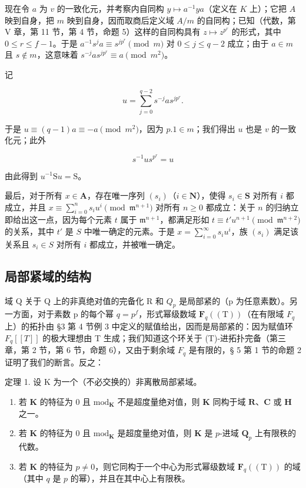 现在令 \(a\) 为 \(v\) 的一致化元，并考察内自同构 \(y \mapsto a^{-1}ya\)（定义在 \(K\) 上）；它把 \(A\) 映到自身，把 \(m\) 映到自身，因而取商后定义域 \(A/m\) 的自同构；已知（代数，第 V 章，第 11 节，第 4 节，命题 5）这样的自同构具有 \(z \mapsto z^{p^r}\) 的形式，其中 \(0 \leqslant r \leqslant f - 1\)。于是 \(a^{-1}s^j a \equiv s^{jp^r} \pmod{m}\) 对 \(0 \leqslant j \leqslant q - 2\) 成立；由于 \(a \in m\) 且 \(s \notin m\)，这意味着 \(s^{-j}as^{jp^r} \equiv a \pmod{m^2}\)。

记

\[
u = \sum_ {j = 0} ^ {q - 2} s ^ {- j} a s ^ {j p ^ {r}}.
\]

于是 \(u \equiv (q - 1)a \equiv -a \pmod{m^2}\)，因为 \(p.1 \in m\)；我们得出 \(u\) 也是 \(v\) 的一致化元；此外

\[
s ^ {- 1} u s ^ {p ^ {r}} = u\tag{3}
\]

由此得到 \(u^{-1} \mathrm{S}u = \mathrm{S}\)。

最后，对于所有 \(x \in \mathbf{A}\)，存在唯一序列 \((s_i)\)（\(i \in \mathbf{N}\)），使得 \(s_i \in \mathbf{S}\) 对所有 \(i\) 都成立，并且 \(x \equiv \sum_{i=0}^{n} s_i u^i \pmod{\mathfrak{m}^{n+1}}\) 对所有 \(n \geqslant 0\) 都成立：关于 \(n\) 的归纳立即给出这一点，因为每个元素 \(t\) 属于 \(\mathfrak{m}^{n+1}\)，都满足形如 \(t \equiv t'u^{n+1} \pmod{\mathfrak{m}^{n+2}}\) 的关系，其中 \(t'\) 是 \(S\) 中唯一确定的元素。于是 \(x = \sum_{i=0}^{\infty} s_i u^i\)，族 \((s_i)\) 满足该关系且 \(s_i \in S\) 对所有 \(i\) 都成立，并被唯一确定。

\subsection{局部紧域的结构}

域 Q 关于 Q 上的非真绝对值的完备化 R 和 \(Q_{p}\) 是局部紧的（p 为任意素数）。另一方面，对于素数 p 的每个幂 \(q = p^{f}\)，形式幂级数域 \(\mathbf{F}_{q}((\mathrm{T}))\)（在有限域 \(F_{q}\) 上）的拓扑由 §3 第 4 节例 3 中定义的赋值给出，因而是局部紧的：因为赋值环 \(F_{q}[[T]]\) 的极大理想由 T 生成；我们知道这个环关于 (T)-进拓扑完备（第三章，第 2 节，第 6 节，命题 6），又由于剩余域 \(F_{q}\) 是有限的，§ 5 第 1 节的命题 2 证明了我们的断言。反之：

定理 1. 设 K 为一个（不必交换的）非离散局部紧域。

\begin{enumerate}
\def\labelenumi{(\roman{enumi})}
\item
  若 \(\mathbf{K}\) 的特征为 0 且 \(\mathrm{mod}_{\mathbf{K}}\) 不是超度量绝对值，则 \(\mathbf{K}\) 同构于域 \(\mathbf{R}\)、\(\mathbf{C}\) 或 \(\mathbf{H}\) 之一。
\item
  若 \(\mathbf{K}\) 的特征为 0 且 \(\mathrm{mod}_{\mathbf{K}}\) 是超度量绝对值，则 \(\mathbf{K}\) 是 \(p\)-进域 \(\mathbf{Q}_p\) 上有限秩的代数。
\item
  若 \(\mathbf{K}\) 的特征为 \(p \neq 0\)，则它同构于一个中心为形式幂级数域 \(\mathbf{F}_q((\mathrm{T}))\) 的域（其中 \(q\) 是 \(p\) 的幂），并且在其中心上有限秩。
\end{enumerate}

